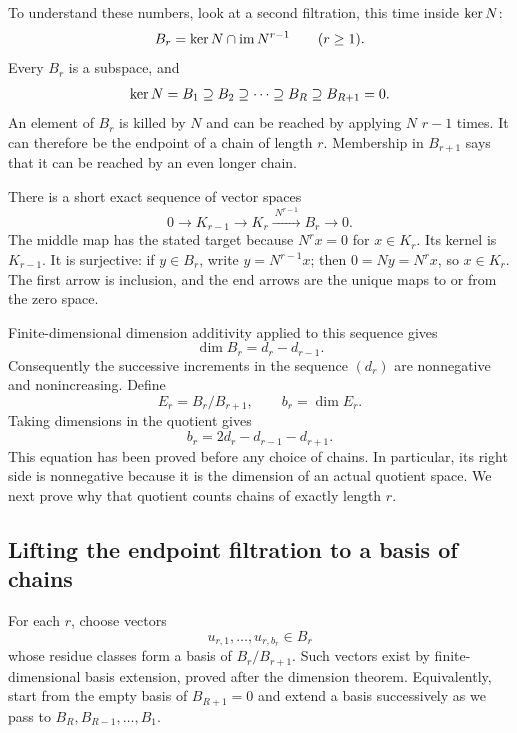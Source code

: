 To understand these numbers, look at a second filtration, this time inside
$\operatorname{ker} N$:
\[
 B_r=\operatorname{ker} N\cap\operatorname{im} N^{r-1}\qquad(r\geq1).
\]
Every $B_r$ is a subspace, and
\[
 \operatorname{ker} N=B_1\supseteq B_2\supseteq\cdots
 \supseteq B_R\supseteq B_{R+1}=0.
\]
An element of $B_r$ is killed by $N$ and can be reached by applying $N$
$r-1$ times. It can therefore be the endpoint of a chain of length $r$.
Membership in $B_{r+1}$ says that it can be reached by an even longer chain.

There is a short exact sequence of vector spaces
\begin{equation}
\label{p:kernel-bottom-ses}
 0\longrightarrow K_{r-1}\longrightarrow K_r
 \xrightarrow{\ N^{r-1}\ } B_r\longrightarrow0.
\end{equation}
The middle map has the stated target because $N^rx=0$ for $x\in K_r$.
Its kernel is $K_{r-1}$. It is surjective: if $y\in B_r$, write
$y=N^{r-1}x$; then $0=Ny=N^rx$, so $x\in K_r$. The first arrow is
inclusion, and the end arrows are the unique maps to or from the zero space.

Finite-dimensional dimension additivity applied to this sequence gives
\begin{equation}
\label{p:bottom-dim}
 \dim B_r=d_r-d_{r-1}.
\end{equation}
Consequently the successive increments in the sequence $(d_r)$ are
nonnegative and nonincreasing. Define
\begin{equation}
\label{p:canonical-multiplicity}
 E_r=B_r/B_{r+1},\qquad b_r=\dim E_r.
\end{equation}
Taking dimensions in the quotient gives
\begin{equation}
\label{p:second-difference}
 \boxed{\ b_r=2d_r-d_{r-1}-d_{r+1}.\ }
\end{equation}
This equation has been proved before any choice of chains. In particular,
its right side is nonnegative because it is the dimension of an actual
quotient space. We next prove why that quotient counts chains of exactly
length $r$.

\subsection{Lifting the endpoint filtration to a basis of chains}
\label{p:chain-construction}

For each $r$, choose vectors
\[
 u_{r,1},\ldots,u_{r,b_r}\in B_r
\]
whose residue classes form a basis of $B_r/B_{r+1}$. Such vectors exist by
finite-dimensional basis extension, proved after the dimension theorem.
Equivalently, start from the empty basis of $B_{R+1}=0$ and extend a basis
successively as we pass to $B_R,B_{R-1},\ldots,B_1$.

